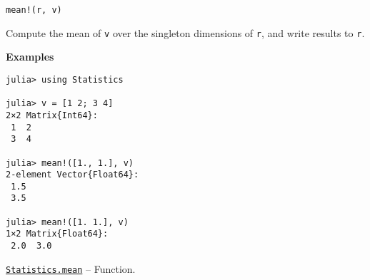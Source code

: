\begin{adjustwidth}{2em}{0pt}


\begin{verbatim}
mean!(r, v)
\end{verbatim}

Compute the mean of \texttt{v} over the singleton dimensions of \texttt{r}, and write results to \texttt{r}.

\textbf{Examples}


\begin{verbatim}
julia> using Statistics

julia> v = [1 2; 3 4]
2×2 Matrix{Int64}:
 1  2
 3  4

julia> mean!([1., 1.], v)
2-element Vector{Float64}:
 1.5
 3.5

julia> mean!([1. 1.], v)
1×2 Matrix{Float64}:
 2.0  3.0
\end{verbatim}



\end{adjustwidth}
\hypertarget{15061550543970113934}{}
\hyperlink{15061550543970113934}{\texttt{Statistics.mean}}  -- {Function.}

